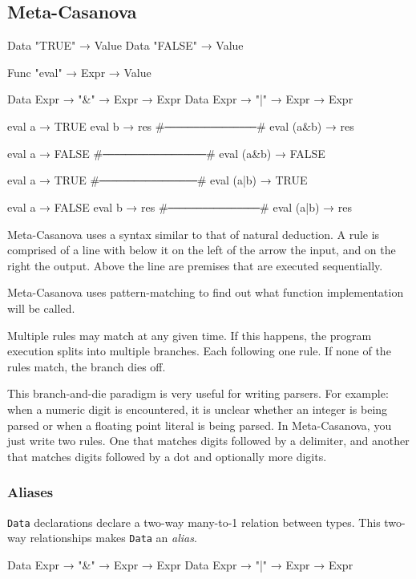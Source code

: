 \subsection{Meta-Casanova}
  \begin{code}[caption=A Boolean expression interpreter in Meta-Casanova.]
  Data "TRUE"  → Value
  Data "FALSE" → Value
  
  Func "eval" → Expr → Value
  
  Data Expr → "&" → Expr → Expr
  Data Expr → "|" → Expr → Expr
  
  
  eval a → TRUE
  eval b → res
  #\verb|────────────────|#
  eval (a&b) → res
  
  
  eval a → FALSE
  #\verb|──────────────────|#
  eval (a&b) → FALSE
  
  
  eval a → TRUE
  #\verb|─────────────────|#
  eval (a|b) → TRUE
  
  
  eval a → FALSE
  eval b → res
  #\verb|────────────────|#
  eval (a|b) → res
  \end{code}

  Meta-Casanova uses a syntax similar to that of natural deduction.
  A rule is comprised of a line with below it on the left of the arrow the input, and on the right the output.
  Above the line are premises that are executed sequentially.

  Meta-Casanova uses pattern-matching to find out what function implementation will be called.

  Multiple rules may match at any given time.
  If this happens, the program execution splits into multiple branches.
  Each following one rule.
  If none of the rules match, the branch dies off. 
  
  This branch-and-die paradigm is very useful for writing parsers\cite{huttonmeijer96}.
  For example: when a numeric digit is encountered,
  it is unclear whether an integer is being parsed or when a floating point literal is being parsed. 
  In Meta-Casanova, you just write two rules.
  One that matches digits followed by a delimiter,
  and another that matches digits followed by a dot and optionally more digits.

  \subsubsection*{Aliases}
  \texttt{Data} declarations declare a two-way \mbox{many-to-1} relation between types.
  This two-way relationships makes \texttt{Data} an \textit{alias}.

  \begin{code}
  Data Expr → "&" → Expr → Expr
  Data Expr → "|" → Expr → Expr
  \end{code}

